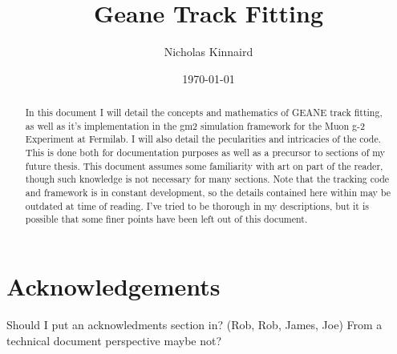 \documentclass{article}
\begin{document}
\title{Geane Track Fitting}
\author{Nicholas Kinnaird}
\date{\today}
\maketitle

\begin{abstract}

    In this document I will detail the concepts and mathematics of GEANE track fitting, as well as it's implementation in the gm2 simulation framework for the Muon g-2 Experiment at Fermilab. I will also detail the pecularities and intricacies of the code. This is done both for documentation purposes as well as a precursor to sections of my future thesis. This document assumes some familiarity with art on part of the reader, though such knowledge is not necessary for many sections. Note that the tracking code and framework is in constant development, so the details contained here within may be outdated at time of reading. I've tried to be thorough in my descriptions, but it is possible that some finer points have been left out of this document.

\end{abstract}















\printbibliography

\section{Acknowledgements}

Should I put an acknowledments section in? (Rob, Rob, James, Joe)
From a technical document perspective maybe not?







\end{document}
